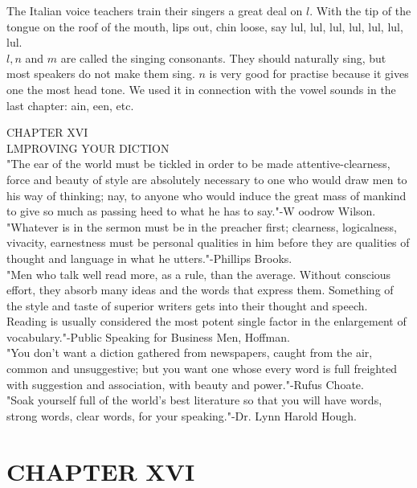 \documentclass[10pt]{article}
\begin{document}
The Italian voice teachers train their singers a great deal on $l$. With the tip of the tongue on the roof of the mouth, lips out, chin loose, say lul, lul, lul, lul, lul, lul, lul.\\
$l, n$ and $m$ are called the singing consonants. They should naturally sing, but most speakers do not make them sing. $n$ is very good for practise because it gives one the most head tone. We used it in connection with the vowel sounds in the last chapter: ain, een, etc.

CHAPTER XVI\\
LMPROVING YOUR DICTION\\
"The ear of the world must be tickled in order to be made attentive-clearness, force and beauty of style are absolutely necessary to one who would draw men to his way of thinking; nay, to anyone who would induce the great mass of mankind to give so much as passing heed to what he has to say."-W oodrow Wilson.\\
"Whatever is in the sermon must be in the preacher first; clearness, logicalness, vivacity, earnestness must be personal qualities in him before they are qualities of thought and language in what he utters."-Phillips Brooks.\\
"Men who talk well read more, as a rule, than the average. Without conscious effort, they absorb many ideas and the words that express them. Something of the style and taste of superior writers gets into their thought and speech. Reading is usually considered the most potent single factor in the enlargement of vocabulary."-Public Speaking for Business Men, Hoffman.\\
"You don't want a diction gathered from newspapers, caught from the air, common and unsuggestive; but you want one whose every word is full freighted with suggestion and association, with beauty and power."-Rufus Choate.\\
"Soak yourself full of the world's best literature so that you will have words, strong words, clear words, for your speaking."-Dr. Lynn Harold Hough.

\section*{CHAPTER XVI}
\end{document}
